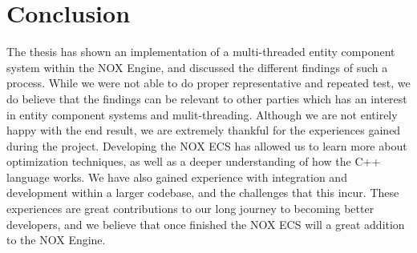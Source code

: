 \chapter{Conclusion}
\label{chap:conclusion}
The thesis has shown an implementation of a multi-threaded entity
component system within the NOX Engine, and discussed the different
findings of such a process.
While we were not able to do proper representative and repeated test,
we do believe that the findings can be relevant to other parties which has
an interest in entity component systems and mulit-threading.
Although we are not entirely happy with the end result,
we are extremely thankful for the experiences gained during the project.
Developing the NOX ECS has allowed us to learn more about optimization techniques,
as well as a deeper understanding of how the C++ language works.
We have also gained experience with integration and development within a larger codebase,
and the challenges that this incur.
These experiences are great contributions to our long journey to becoming better developers,
and we believe that once finished the NOX ECS will a great addition to the NOX Engine.
